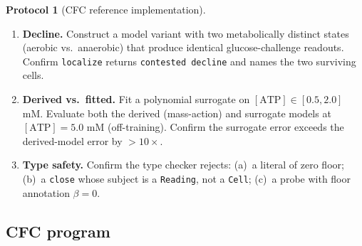 \documentclass[11pt,a4paper]{article}
\theoremstyle{expthm}
\theoremstyle{definition}
\newtheorem{protocol}[theorem]{Protocol}
\theoremstyle{remark}
\newcommand{\flo}{\beta}
\newcommand{\cf}[1]{\texttt{#1}}
\begin{document}
\begin{protocol}[CFC reference implementation]
\begin{enumerate}[leftmargin=1.4em,itemsep=3pt]
\item \textbf{Decline.} Construct a model variant with two metabolically
  distinct states (aerobic vs.\ anaerobic) that produce identical
  glucose-challenge readouts. Confirm \cf{localize} returns
  \cf{contested decline} and names the two surviving cells.
\item \textbf{Derived vs.\ fitted.} Fit a polynomial surrogate on
  $[\mathrm{ATP}] \in [0.5, 2.0]$ mM. Evaluate both the derived
  (mass-action) and surrogate models at $[\mathrm{ATP}] = 5.0$ mM
  (off-training). Confirm the surrogate error exceeds the derived-model
  error by $> 10\times$.
\item \textbf{Type safety.} Confirm the type checker rejects: (a)~a
  literal of zero floor; (b)~a \cf{close} whose subject is a
  \cf{Reading}, not a \cf{Cell}; (c)~a probe with floor annotation
  $\flo = 0$.
\end{enumerate}
\end{protocol}

\subsection{CFC program}
\end{document}
